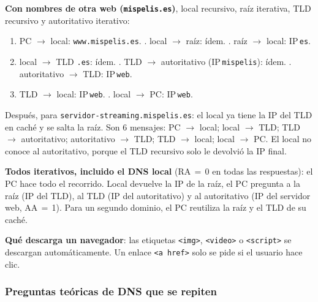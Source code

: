 \documentclass[11pt,a4paper]{article}
\begin{document}
\textbf{Con nombres de otra web (\texttt{mispelis.es})}, local recursivo, raíz iterativa, TLD recursivo y autoritativo iterativo:
\begin{enumerate}[leftmargin=1.6em,itemsep=1pt]
  \item PC $\to$ local: \texttt{www.mispelis.es}. . local $\to$ raíz: ídem. . raíz $\to$ local: IP\,\texttt{es}.
  \item[4.] local $\to$ TLD \texttt{.es}: ídem. . TLD $\to$ autoritativo (IP\,\texttt{mispelis}): ídem. . autoritativo $\to$ TLD: IP\,\texttt{web}.
  \item[7.] TLD $\to$ local: IP\,\texttt{web}. . local $\to$ PC: IP\,\texttt{web}.
\end{enumerate}
Después, para \texttt{servidor-streaming.mispelis.es}: el local ya tiene la IP del TLD en caché y se salta la raíz. Son 6 mensajes: PC $\to$ local; local $\to$ TLD; TLD $\to$ autoritativo; autoritativo $\to$ TLD; TLD $\to$ local; local $\to$ PC. El local no conoce al autoritativo, porque el TLD recursivo solo le devolvió la IP final.

\textbf{Todos iterativos, incluido el DNS local} (RA\,$=$\,0 en todas las respuestas): el PC hace todo el recorrido. Local devuelve la IP de la raíz, el PC pregunta a la raíz (IP del TLD), al TLD (IP del autoritativo) y al autoritativo (IP del servidor web, AA\,$=$\,1). Para un segundo dominio, el PC reutiliza la raíz y el TLD de su caché.

\textbf{Qué descarga un navegador}: las etiquetas \texttt{<img>}, \texttt{<video>} o \texttt{<script>} se descargan automáticamente. Un enlace \texttt{<a href>} solo se pide si el usuario hace clic.

\subsubsection{Preguntas teóricas de DNS que se repiten}
\end{document}
